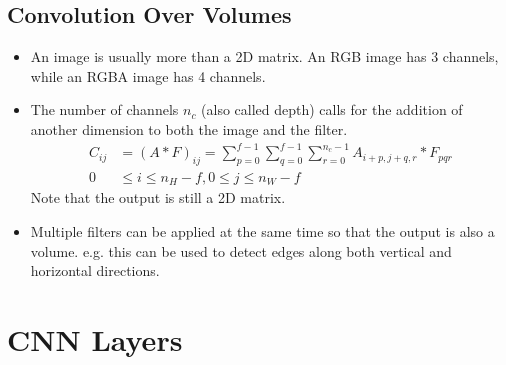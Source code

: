 \subsection{Convolution Over Volumes}
\begin{itemize}
  \item An image is usually more than a 2D matrix. An RGB image has 3 channels, while an RGBA image has 4 channels. 
  \item The number of channels $n_c$ (also called depth) calls for the addition of another dimension to both the image and the filter.
  \begin{align*}
    C_{ij}&=\left(A*F\right)_{ij}=\displaystyle\sum_{p=0}^{f-1}\displaystyle\sum_{q=0}^{f-1}\displaystyle\sum_{r=0}^{n_c-1}A_{i+p,j+q,r}*F_{pqr}\\
    0&\le i\le n_H-f, 0\le j\le n_W-f
  \end{align*}
  Note that the output is still a 2D matrix.
  \item Multiple filters can be applied at the same time so that the output is also a volume. e.g. this can be used to detect edges along both vertical and horizontal directions.
\end{itemize}
\section{CNN Layers}
